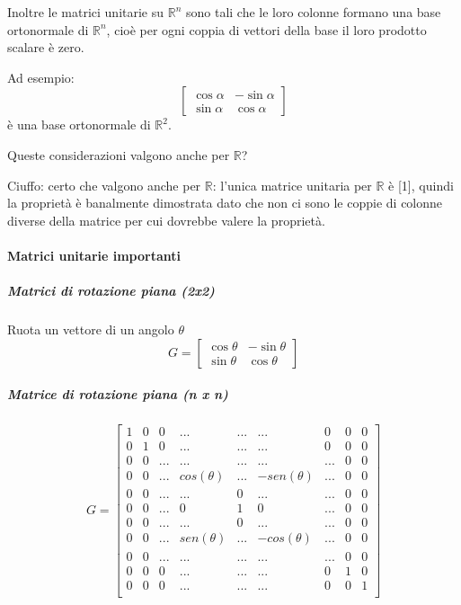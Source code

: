 Inoltre le matrici unitarie su $\mathbb{R}^n$ sono tali che le loro colonne
formano una base ortonormale di $\mathbb{R}^n$, cio\`e per ogni coppia
di vettori della base il loro prodotto scalare \`e zero.\\
\begin{example}
  Ad esempio:
$$
\begin{bmatrix} 
  \cos \alpha & -\sin \alpha \\
  \sin \alpha & \cos \alpha
\end{bmatrix}
$$
\`e una base ortonormale di $\mathbb{R}^{2}$.
\end{example}

\begin{openquestion}
Queste considerazioni valgono anche per $\mathbb{R}$?

Ciuffo: certo che valgono anche per  $\mathbb{R}$: l'unica matrice
 unitaria per $\mathbb{R}$ \`e [1], quindi la proprietà
\`e banalmente dimostrata dato che non ci sono le coppie di colonne 
diverse della matrice per cui dovrebbe valere la proprietà.
\end{openquestion}

\paragraph{Matrici  unitarie importanti}
\subparagraph{Matrici di rotazione piana (2x2)}
Ruota un vettore di un angolo $\theta$
$$
G = 
\begin{bmatrix} 
\cos \theta & -\sin \theta \\
\sin \theta &  \cos \theta 
\end{bmatrix} 
$$

\subparagraph{Matrice di rotazione piana (n x n)}
$$ G =
\begin{bmatrix}
1 & 0 & 0 &...& ... &... & 0 & 0 & 0 \\
0 & 1 & 0 &... & ... &... & 0 & 0 & 0 \\
0 & 0 & ... & ... & ... &... & ...&0 & 0 \\
0 & 0 & ...  & cos(\theta ) &  ... & -sen(\theta ) & ... & 0&0 \\
0 & 0 & ... &  ... & 0 &... & ...& 0& 0 \\
0 & 0 & ... & 0 & 1 & 0 &...&0 &0\\
0 & 0 & ... & ... & 0 &... & ...& 0 & 0 \\
0 & 0 & ...  & sen(\theta ) &  ... & -cos(\theta ) & ...&0 &0 \\
0 & 0 & ... & ... & ... & ... & ...&0 & 0 \\
0 & 0 & 0 &... & ... & ... & 0 & 1 & 0 \\
0 & 0 & 0 &... & ... &... & 0 & 0 & 1 \\
\end{bmatrix}
$$

